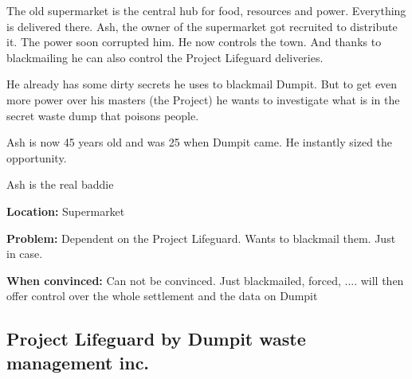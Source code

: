 \begin{npcBox}[title=Ash]
    \begin{stressSection}
    \end{stressSection}
    \begin{tabularx}{\textwidth}{ XX }
    \end{tabularx}

    \begin{consequences}
    \item {}
    \item {}
    \item {}
    \end{consequences}

    \begin{npcDescription}
    The old supermarket is the central hub for food, resources and power. Everything is delivered there. Ash, the owner of the supermarket got recruited to distribute it. The power soon corrupted him. He now controls the town. And thanks to blackmailing he can also control the Project Lifeguard deliveries.

    He already has some dirty secrets he uses to blackmail Dumpit. But to get even more power over his masters (the Project) he wants to investigate what is in the secret waste dump that poisons people.

    Ash is now 45 years old and was 25 when Dumpit came. He instantly sized the opportunity.

    Ash is the real baddie

    \textbf{Location:} Supermarket

    \textbf{Problem:} Dependent on the Project Lifeguard. Wants to blackmail them. Just in case.

    \textbf{When convinced:} Can not be convinced. Just blackmailed, forced, .... will then offer control over the whole settlement and the data on Dumpit
    \end{npcDescription}

\end{npcBox}




\subsection{Project Lifeguard by Dumpit waste management inc.}

